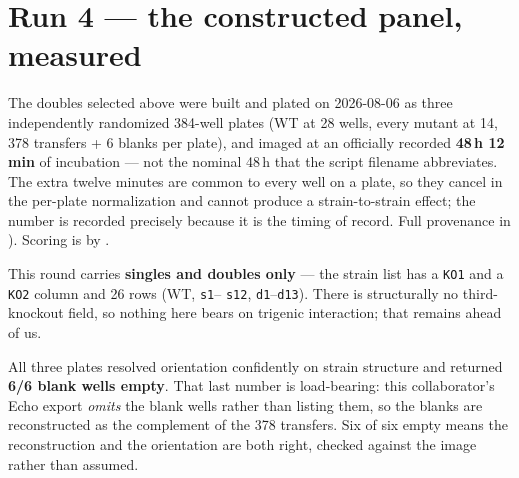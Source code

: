 \section{Run 4 --- the constructed panel, measured}
\label{sec:run4-fitness}

The doubles selected above were built and plated on 2026-08-06 as three independently
randomized 384-well plates (WT at 28 wells, every mutant at 14, 378 transfers + 6 blanks per
plate), and imaged at an officially recorded \textbf{48\,h 12\,min} of incubation --- not the
nominal 48\,h that the script filename abbreviates. The extra twelve minutes are common to
every well on a plate, so they cancel in the per-plate normalization and cannot produce a
strain-to-strain effect; the number is recorded precisely because it is the timing of record.
Full provenance in
).
Scoring is by .

 This round carries \textbf{singles and doubles only} --- the
strain list has a \texttt{KO1} and a \texttt{KO2} column and 26 rows (WT, \texttt{s1}--%
\texttt{s12}, \texttt{d1}--\texttt{d13}). There is structurally no third-knockout field, so
nothing here bears on trigenic interaction; that remains ahead of us.

 All three plates resolved orientation confidently on strain structure
and returned \textbf{6/6 blank wells empty}. That last number is load-bearing: this
collaborator's Echo export \emph{omits} the blank wells rather than listing them, so the
blanks are reconstructed as the complement of the 378 transfers. Six of six empty means the
reconstruction and the orientation are both right, checked against the image rather than
assumed.


